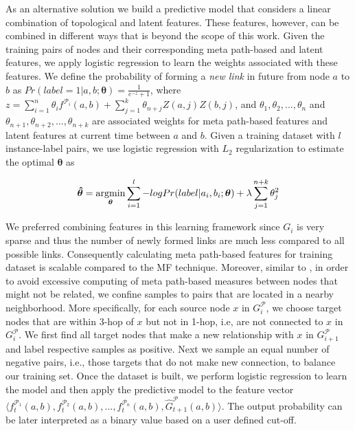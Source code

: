 As an alternative solution we build a predictive model that considers a linear combination of topological and latent features. These features, however, can be combined in different ways that is beyond the scope of this work. Given the training pairs of nodes and their corresponding meta path-based and latent features, we apply logistic regression to learn the weights associated with these features. We define the probability of forming a \textit{new link} in future from node $a$ to $b$ as %
 $Pr(label=1|a, b; \boldsymbol{\theta}) = \frac{1}{e^{-z}+1}$, where $z=\sum\limits_{i=1}^{n}\theta_i f^{\mathcal{P}_i}(a,b) + \sum\limits_{j=1}^{k} \theta_{n+j}Z(a,j)Z(b,j)$, and $\theta_1,\theta_2,..., \theta_n$ and $\theta_{n+1},\theta_{n+2},..., \theta_{n+k}$ are associated weights for meta path-based features and latent features at current time between $a$ and $b$. Given a training dataset with $l$ instance-label pairs, we use logistic regression with $L_2$ regularization to estimate the optimal $\boldsymbol{\theta}$ as%


\begin{equation}
\boldsymbol{\hat{\theta}} = 
\operatorname*{argmin}\limits_{\boldsymbol{\theta}}\sum_{i=1}^l -log Pr(label |a_i, b_i; \boldsymbol{\theta}) + \lambda \sum_{j=1}^{n+k} \theta_j^2
\end{equation}
 
We preferred combining features in this learning framework since $G_i$ is very sparse and thus the number of newly formed links are much less compared to all possible links. Consequently calculating meta path-based features for training dataset is scalable compared to the MF technique. Moreover, similar to \cite{sun2011ASONAM}, in order to avoid excessive computing of meta path-based measures between nodes that might not be related, we confine samples to pairs that are located in a nearby neighborhood. More specifically, for each source node $x$ in $G^\mathcal{P}_{i}$, we choose target nodes that are within 3-hop of $x$ but not in 1-hop, i.e, are not connected to $x$ in $G^\mathcal{P}_{i}$. We first find all target nodes that make a new relationship with $x$  in $G^\mathcal{P}_{i+1}$ and label respective samples as positive. Next we sample an equal number of negative pairs, i.e., those targets that do not make new connection, to balance our training set. Once the dataset is built, we perform logistic regression to learn the model and then apply the predictive model to the feature vector  $\langle f^{\mathcal{P}_1}_{t}(a,b), f^{\mathcal{P}_2}_{t}(a,b), ..., f^{\mathcal{P}_n}_{t}(a,b), \hat{G}^\mathcal{P}_{t+1}(a,b)\rangle$. The output probability can be later interpreted as a binary value based on a user defined cut-off.

